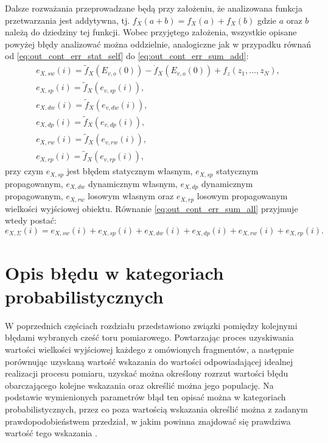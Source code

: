 Dalsze rozważania przeprowadzane będą przy założeniu, że analizowana funkcja przetwarzania jest addytywna, tj. $f_{X}(a + b) = f_{X}(a) + f_{X}(b)$ gdzie $a$ oraz $b$ należą do dziedziny tej funkcji. Wobec przyjętego założenia, wszystkie opisane powyżej błędy analizować można oddzielnie, analogiczne jak w przypadku równań od \eqref{eq:out_cont_err_stat_self} do \eqref{eq:out_cont_err_sum_add}:
\begin{gather}
e_{X,sw} \left( i \right) = \tilde{f}_{X} \left( E_{v,o} \left( 0 \right) \right) - \dot{f}_{X} \left( E_{v,o} \left( 0 \right) \right) + f_{z} \left( z_{1}, \hdots, z_{N} \right) \label{eq:out_disc_err_stat_self}, \\
e_{X,sp} \left( i \right) = \tilde{f}_{X} \left( e_{v,sp} \left( i \right) \right) \label{eq:out_disc_err_stat_prop}, \\
e_{X,dw} \left( i \right) = \tilde{f}_{X} \left( e_{v,dw} \left( i \right) \right) \label{eq:out_disc_err_dyn_prop}, \\
e_{X,dp} \left( i \right) = \tilde{f}_{X} \left( e_{v,dp} \left( i \right) \right) \label{eq:out_disc_err_dyn_self}, \\
e_{X,rw} \left( i \right) = \tilde{f}_{X} \left( e_{v,rw} \left( i \right) \right) \label{eq:out_disc_err_rand_self}, \\
e_{X,rp} \left( i \right) = \tilde{f}_{X} \left( e_{v,rp} \left( i \right) \right) \label{eq:out_disc_err_rand_prop},
\end{gather}
przy czym $e_{X,sp}$ jest błędem statycznym własnym, $e_{X,sp}$ statycznym propagowanym, $e_{X,dw}$ dynamicznym własnym, $e_{X,dp}$ dynamicznym propagowanym, $e_{X,rw}$ losowym własnym oraz $e_{X,rp}$ losowym propagowanym wielkości wyjściowej obiektu. Równanie \eqref{eq:out_cont_err_sum_all} przyjmuje wtedy postać:
\begin{equation}
e_{X,\Sigma} \left( i \right) = e_{X,sw} \left( i \right) + e_{X,sp} \left( i \right) + e_{X,dw} \left( i \right) + e_{X,dp} \left( i \right) + e_{X,rw} \left( i \right) + e_{X,rp} \left( i \right) \label{eq:out_disc_err_sum_add}.
\end{equation}

\section{Opis błędu w kategoriach probabilistycznych}

W poprzednich częściach rozdziału przedstawiono związki pomiędzy kolejnymi błędami wybranych cześć toru pomiarowego. Powtarzając proces uzyskiwania wartości wielkości wyjściowej każdego z omówionych fragmentów, a następnie porównując uzyskaną wartość wskazania do wartości odpowiadającej idealnej realizacji procesu pomiaru, uzyskać można określony rozrzut wartości błędu obarczającego kolejne wskazania oraz określić można jego populację. Na podstawie wymienionych parametrów błąd ten opisać można w kategoriach probabilistycznych, przez co poza wartością wskazania określić można z zadanym prawdopodobieństwem przedział, w jakim powinna znajdować się prawdziwa wartość tego wskazania \cite{jcgm_guide}.

